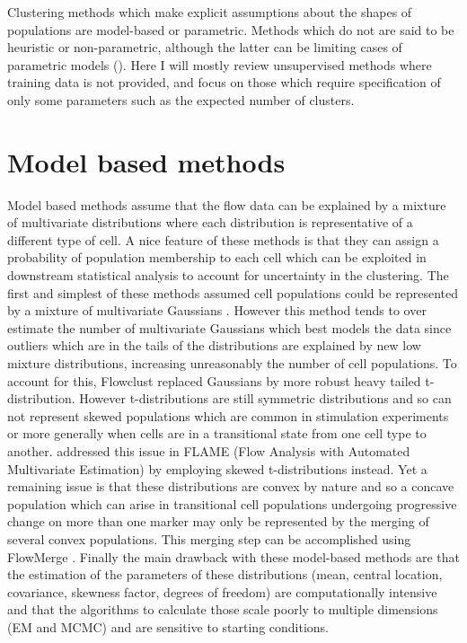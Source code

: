 Clustering methods which make explicit assumptions about the shapes of populations are model-based or parametric.
Methods which do not are said to be heuristic or non-parametric,
although the latter can be limiting cases of parametric models ().
Here I will mostly review unsupervised methods where training data is not provided,
and focus on those which require specification of only some parameters such as the expected
number of clusters.

\section{Model based methods}

Model based methods assume that the flow data can be explained by a mixture of multivariate distributions where each distribution is representative of a different type of cell.
A nice feature of these methods is that they can assign a probability of population membership to each cell which can be exploited in downstream statistical analysis to account for uncertainty in the clustering.
The first and simplest of these methods assumed cell populations could be represented by a mixture of multivariate Gaussians \citep{Chan:2008gq}.
However this method tends to over estimate the number of multivariate Gaussians which best models the data since outliers which are in the tails of the distributions
are explained by new low mixture distributions, increasing unreasonably the number of cell populations.
To account for this, Flowclust \citep{Lo:2008it} replaced Gaussians by more robust heavy tailed t-distribution.
However t-distributions are still symmetric distributions and so can not represent skewed populations which are common in stimulation experiments or more generally when cells are in a transitional state from one cell type to another.
\citet{Pyne:2009hl} addressed this issue in FLAME (Flow Analysis with Automated Multivariate Estimation) by employing skewed t-distributions instead.
Yet a remaining issue is that these distributions are convex by nature and so a concave population which can arise in transitional cell populations undergoing progressive change on more than one marker may only be represented by the merging of several convex populations.
This merging step can be accomplished using FlowMerge \citep{Finak:2009fk}.
Finally the main drawback with these model-based methods are that the estimation of the parameters of these distributions (mean, central location, covariance, skewness factor,
degrees of freedom) are computationally intensive and that the algorithms to calculate those scale poorly to multiple dimensions (EM \citep{Dempster:1977ul} and MCMC)
and are sensitive to starting conditions.

